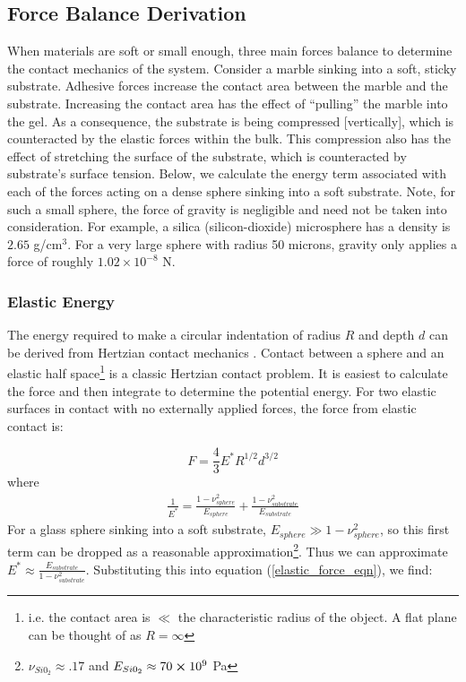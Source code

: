 \subsection{Force Balance Derivation}
When materials are soft or small enough, three main forces balance to determine the contact mechanics of the system. Consider a marble sinking into a soft, sticky substrate. Adhesive forces increase the contact area between the marble and the substrate. Increasing the contact area has the effect of ``pulling'' the marble into the gel. As a consequence, the substrate is being compressed [vertically], which is counteracted by the elastic forces within the bulk. This compression also has the effect of stretching the surface of the substrate, which is counteracted by substrate's surface tension. Below, we calculate the energy term associated with each of the forces acting on a dense sphere sinking into a soft substrate. Note, for such a small sphere, the force of gravity is negligible and need not be taken into consideration. For example, a silica (silicon-dioxide) microsphere has a density is $2.65$ g/cm$^3$. For a very large sphere with radius 50 microns, gravity only applies a force of roughly $ 1.02 \times 10^{-8} $ N.

\subsubsection{Elastic Energy}
The energy required to make a circular indentation of radius $ R $ and depth $ d $ can be derived from Hertzian contact mechanics \cite{hertz1882uber, style2013surface,cao2016nanoparticles}. Contact between a sphere and an elastic half space\footnote{i.e. the contact area is $ \ll $ the characteristic radius of the object. A flat plane can be thought of as $ R = \infty $}   is a classic Hertzian contact problem. It is easiest to calculate the force and then integrate to determine the potential energy. For two elastic surfaces in contact with no externally applied forces, the force from elastic contact is:

\begin{equation}
F = \frac{4}{3}E^*R^{1/2}d^{3/2}
\label{elastic_force_eqn}
\end{equation} 
where 
\begin{align*}
\frac{1}{E^*} = \frac{1-\nu_{sphere}^2}{E_{sphere}} + \frac{1-\nu_{substrate}^2}{E_{substrate}} 
\end{align*}
For a glass sphere sinking into a soft substrate, $ E_{sphere} \gg 1-\nu_{sphere}^2 $, so this first term can be dropped as a reasonable approximation\footnote{$\nu_{Si0_2} \approx .17 $ and $ E_{Si0_2} \approx 70 \cross 10^9 $ Pa}. Thus we can approximate $ E^* \approx \frac{E_{substrate}}{1-\nu_{substrate}^2} $. Substituting this into equation (\ref{elastic_force_eqn}), we find:

